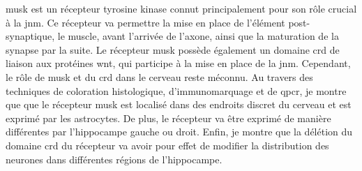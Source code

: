 \Acrshort{musk} est un récepteur tyrosine kinase connut principalement pour son rôle crucial à la \acrshort{jnm}. Ce récepteur va permettre la mise en place de l'élément post-synaptique, le muscle, avant l'arrivée de l'axone, ainsi que la maturation de la synapse par la suite. Le récepteur \acrshort{musk} possède également un domaine \acrshort{crd} de liaison aux protéines \acrshort{wnt}, qui participe à la mise en place de la \acrshort{jnm}. Cependant, le rôle de \acrshort{musk} et du \acrshort{crd} dans le cerveau reste méconnu. Au travers des techniques de coloration histologique, d'immunomarquage et de \acrshort{qpcr}, je montre que que le récepteur \gls{musk} est localisé dans des endroits discret du cerveau et est exprimé par les astrocytes. De plus, le récepteur va être exprimé de manière différentes par l'hippocampe gauche ou droit. Enfin, je montre que la délétion du domaine \acrshort{crd} du récepteur va avoir pour effet de modifier la distribution des neurones dans différentes régions de l'hippocampe.